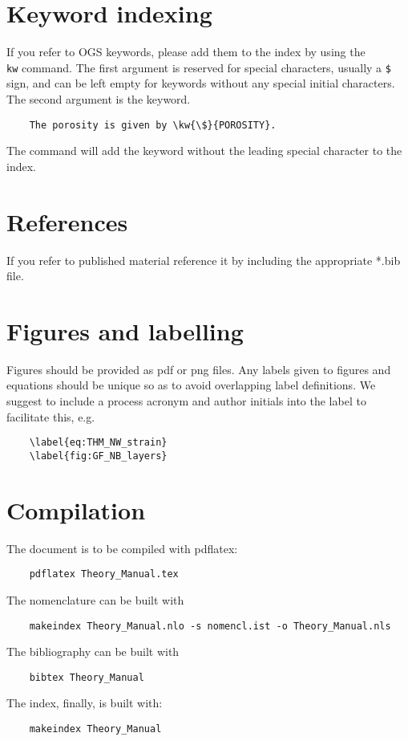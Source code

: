 \section{Keyword indexing}
If you refer to OGS keywords, please add them to the index by using the \texttt{\\kw} command. The first argument is reserved for special characters, usually a \texttt{\$} sign, and can be left empty for keywords without any special initial characters. The second argument is the keyword.
\begin{verbatim}
	The porosity is given by \kw{\$}{POROSITY}. 
\end{verbatim}
The command will add the keyword without the leading special character to the index.

\section{References}
If you refer to published material reference it by including the appropriate *.bib file.

\section{Figures and labelling}
Figures should be provided as pdf or png files. Any labels given to figures and equations should be unique so as to avoid overlapping label definitions. We suggest to include a process acronym and author initials into the label to facilitate this, e.g.
\begin{verbatim}
	\label{eq:THM_NW_strain}
	\label{fig:GF_NB_layers}
\end{verbatim}

\section{Compilation}
The document is to be compiled with pdflatex:
\begin{verbatim}
	pdflatex Theory_Manual.tex
\end{verbatim}
The nomenclature can be built with
\begin{verbatim}
	makeindex Theory_Manual.nlo -s nomencl.ist -o Theory_Manual.nls
\end{verbatim}
The bibliography can be built with 
\begin{verbatim}
	bibtex Theory_Manual
\end{verbatim}
The index, finally, is built with:
\begin{verbatim}
	makeindex Theory_Manual
\end{verbatim}